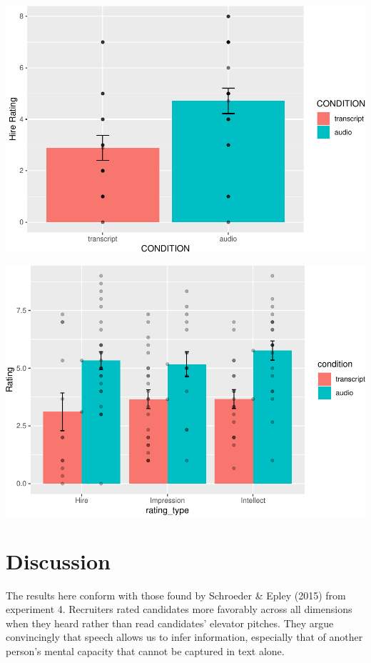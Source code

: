 \documentclass[
  english,
  man]{apa6}
\begin{document}
\includegraphics{CSF-semester-project_files/figure-latex/unnamed-chunk-5-1.pdf}

\includegraphics{CSF-semester-project_files/figure-latex/unnamed-chunk-6-1.pdf}

\hypertarget{discussion}{%
\section{Discussion}\label{discussion}}

The results here conform with those found by Schroeder \& Epley (2015) from experiment 4. Recruiters rated candidates more favorably across all dimensions when they heard rather than read candidates' elevator pitches. They argue convincingly that speech allows us to infer information, especially that of another person's mental capacity that cannot be captured in text alone.
\end{document}
